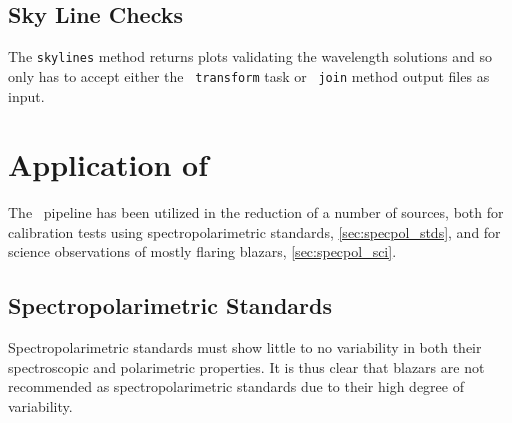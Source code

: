 \subsection{Sky Line Checks} \label{subsec:test_sky}

The \texttt{skylines} method returns plots validating the wavelength solutions and so only has to accept either the \iraf\ \texttt{transform} task or \stops\ \texttt{join} method output files as input.




\section[Application of \textsc{stops}]{Application of \stops}

The \stops\ pipeline has been utilized in the reduction of a number of sources, both for calibration tests using spectropolarimetric standards, \autoref{sec:specpol_stds}, and for science observations of mostly flaring blazars, \autoref{sec:specpol_sci}.

\subsection{Spectropolarimetric Standards} \label{sec:specpol_stds}



Spectropolarimetric standards must show little to no variability in both their spectroscopic and polarimetric properties. It is thus clear that blazars are not recommended as spectropolarimetric standards due to their high degree of variability.

